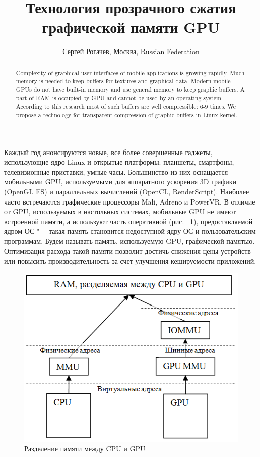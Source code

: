 \documentclass[10pt, a5paper]{article}
\begin{document}
\title{Технология прозрачного сжатия графической памяти GPU}
\author{Сергей Рогачев, Москва, Russian Federation}
\maketitle
\begin{abstract}
Complexity of graphical user interfaces of mobile applications is growing rapidly. Much memory is needed to keep buffers for textures and graphical data. Modern mobile GPUs do not have built-in memory and use general memory to keep graphic buffers. A part of RAM is occupied by GPU and cannot be used by an operating system. According to this research most of such buffers are well compressible: 6-9 times. We propose a technology for transparent compression of graphic buffers in Linux kernel.
\end{abstract}
Каждый год анонсируются новые, все более совершенные гаджеты, использующие ядро Linux и открытые платформы: планшеты, смартфоны, телевизионные приставки, умные часы. Большинство из них оснащается мобильными GPU, используемыми для аппаратного ускорения 3D графики (OpenGL ES) и параллельных вычислений (OpenCL, RenderScript). Наиболее часто встречаются графические процессоры Mali, Adreno и PowerVR. В отличие от GPU, используемых в настольных системах, мобильные GPU не имеют встроенной памяти, а используют часть оперативной (рис. ~\ref{Rogachev1}), предоставляемой ядром ОС "--- такая память становится недоступной ядру ОС и пользовательским программам. Будем называть память, используемую GPU, графической памятью. Оптимизация расхода такой памяти позволит достичь снижения цены устройств или повысить производительность за счет улучшения кешируемости приложений.

\begin{figure}
  \centering
  \includegraphics[]{18_2016_Rogachev1.png}
  \caption{Разделение памяти между CPU и GPU}
  \label{Rogachev1}
\end{figure}
\end{document}
